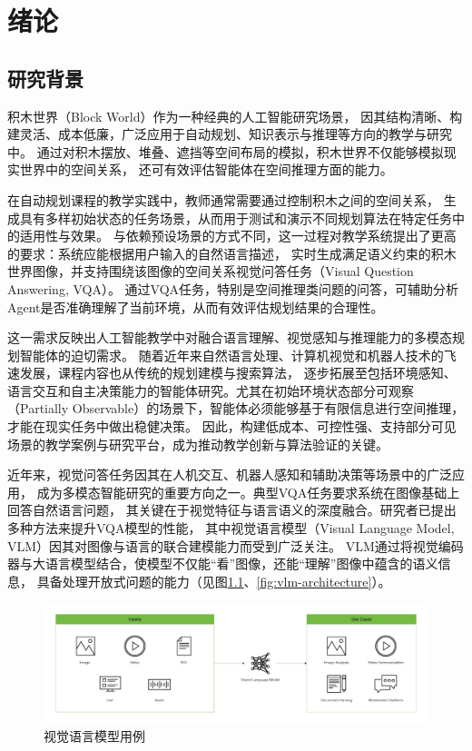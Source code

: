 \chapter{绪论}
\section{研究背景}
积木世界（Block World）\cite{hogg1983block}作为一种经典的人工智能研究场景，
因其结构清晰、构建灵活、成本低廉，广泛应用于自动规划、知识表示与推理等方向的教学与研究中。
通过对积木摆放、堆叠、遮挡等空间布局的模拟，积木世界不仅能够模拟现实世界中的空间关系，
还可有效评估智能体在空间推理方面的能力。

在自动规划课程的教学实践中，教师通常需要通过控制积木之间的空间关系，
生成具有多样初始状态的任务场景，从而用于测试和演示不同规划算法在特定任务中的适用性与效果。
与依赖预设场景的方式不同，这一过程对教学系统提出了更高的要求：系统应能根据用户输入的自然语言描述，
实时生成满足语义约束的积木世界图像，并支持围绕该图像的空间关系视觉问答任务（Visual Question Answering, VQA）。
通过VQA任务，特别是空间推理类问题的问答，可辅助分析Agent是否准确理解了当前环境，从而有效评估规划结果的合理性。

这一需求反映出人工智能教学中对融合语言理解、视觉感知与推理能力的多模态规划智能体的迫切需求。
随着近年来自然语言处理、计算机视觉和机器人技术的飞速发展，课程内容也从传统的规划建模与搜索算法，
逐步拓展至包括环境感知、语言交互和自主决策能力的智能体研究\cite{10.5555/3073924, gao2025multimodalagenttuningbuilding}。尤其在初始环境状态部分可观察（Partially Observable）的场景下，智能体必须能够基于有限信息进行空间推理，才能在现实任务中做出稳健决策。
因此，构建低成本、可控性强、支持部分可见场景的教学案例与研究平台，成为推动教学创新与算法验证的关键。

近年来，视觉问答任务因其在人机交互、机器人感知和辅助决策等场景中的广泛应用，
成为多模态智能研究的重要方向之一\cite{goyal2017making}。典型VQA任务要求系统在图像基础上回答自然语言问题，
其关键在于视觉特征与语言语义的深度融合。研究者已提出多种方法来提升VQA模型的性能，
其中视觉语言模型（Visual Language Model, VLM）因其对图像与语言的联合建模能力而受到广泛关注。
VLM通过将视觉编码器与大语言模型结合，使模型不仅能“看”图像，还能“理解”图像中蕴含的语义信息，
具备处理开放式问题的能力（见图\ref{fig:vlm-example}、\ref{fig:vlm-architecture}）。

\begin{figure}
    \centering
    \includegraphics[width=\textwidth]{figures/VLM-example.png}
    \caption{视觉语言模型用例}
    \label{fig:vlm-example}
\end{figure}

